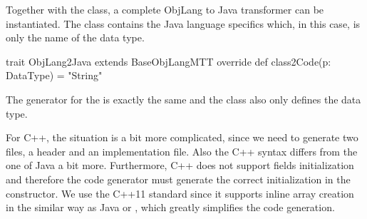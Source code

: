 Together with the \href{https://github.com/fikovnik/ttc14-fixml-sigma/blob/master/ttc14-fixml-base/src/fr/inria/spirals/sigma/ttc14/fixml/ObjLang2Java.scala}{} class, a complete ObjLang to Java transformer can be instantiated.
The class \href{https://github.com/fikovnik/ttc14-fixml-sigma/blob/master/ttc14-fixml-base/src/fr/inria/spirals/sigma/ttc14/fixml/ObjLang2Java.scala}{} contains the Java language specifics which, in this case, is only the name of the  data type.
%
\begin{scalacode}
trait ObjLang2Java extends BaseObjLangMTT {
  override def class2Code(p: DataType) = "String"
}
\end{scalacode}

The generator for the \Csharp is exactly the same and the class \href{https://github.com/fikovnik/ttc14-fixml-sigma/blob/master/ttc14-fixml-base/src/fr/inria/spirals/sigma/ttc14/fixml/ObjLang2CSharp.scala}{} also only defines the  data type.

For C++, the situation is a bit more complicated, since we need to generate two files, a header and an implementation file.
Also the C++ syntax differs from the one of Java a bit more.
Furthermore, C++ does not support fields initialization and therefore the code generator must generate the correct initialization in the constructor.
We use the C++11 standard since it supports inline array creation in the similar way as Java or \Csharp, which greatly simplifies the code generation.

